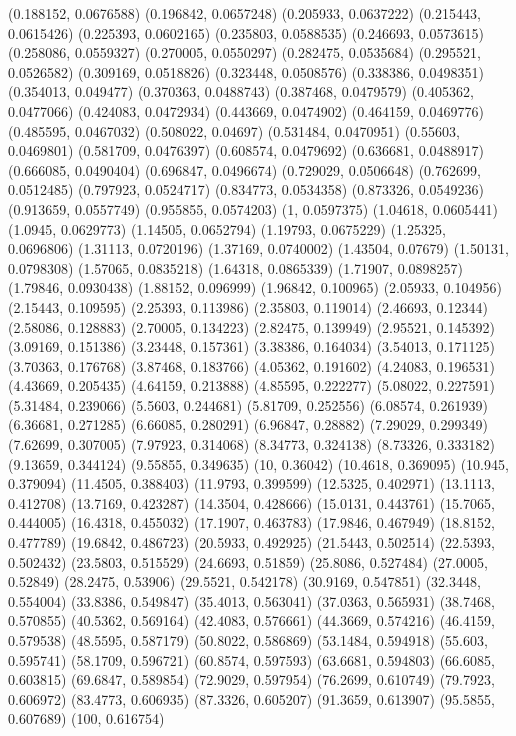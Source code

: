 {(0.188152, 0.0676588)
(0.196842, 0.0657248)
(0.205933, 0.0637222)
(0.215443, 0.0615426)
(0.225393, 0.0602165)
(0.235803, 0.0588535)
(0.246693, 0.0573615)
(0.258086, 0.0559327)
(0.270005, 0.0550297)
(0.282475, 0.0535684)
(0.295521, 0.0526582)
(0.309169, 0.0518826)
(0.323448, 0.0508576)
(0.338386, 0.0498351)
(0.354013, 0.049477)
(0.370363, 0.0488743)
(0.387468, 0.0479579)
(0.405362, 0.0477066)
(0.424083, 0.0472934)
(0.443669, 0.0474902)
(0.464159, 0.0469776)
(0.485595, 0.0467032)
(0.508022, 0.04697)
(0.531484, 0.0470951)
(0.55603, 0.0469801)
(0.581709, 0.0476397)
(0.608574, 0.0479692)
(0.636681, 0.0488917)
(0.666085, 0.0490404)
(0.696847, 0.0496674)
(0.729029, 0.0506648)
(0.762699, 0.0512485)
(0.797923, 0.0524717)
(0.834773, 0.0534358)
(0.873326, 0.0549236)
(0.913659, 0.0557749)
(0.955855, 0.0574203)
(1, 0.0597375)
(1.04618, 0.0605441)
(1.0945, 0.0629773)
(1.14505, 0.0652794)
(1.19793, 0.0675229)
(1.25325, 0.0696806)
(1.31113, 0.0720196)
(1.37169, 0.0740002)
(1.43504, 0.07679)
(1.50131, 0.0798308)
(1.57065, 0.0835218)
(1.64318, 0.0865339)
(1.71907, 0.0898257)
(1.79846, 0.0930438)
(1.88152, 0.096999)
(1.96842, 0.100965)
(2.05933, 0.104956)
(2.15443, 0.109595)
(2.25393, 0.113986)
(2.35803, 0.119014)
(2.46693, 0.12344)
(2.58086, 0.128883)
(2.70005, 0.134223)
(2.82475, 0.139949)
(2.95521, 0.145392)
(3.09169, 0.151386)
(3.23448, 0.157361)
(3.38386, 0.164034)
(3.54013, 0.171125)
(3.70363, 0.176768)
(3.87468, 0.183766)
(4.05362, 0.191602)
(4.24083, 0.196531)
(4.43669, 0.205435)
(4.64159, 0.213888)
(4.85595, 0.222277)
(5.08022, 0.227591)
(5.31484, 0.239066)
(5.5603, 0.244681)
(5.81709, 0.252556)
(6.08574, 0.261939)
(6.36681, 0.271285)
(6.66085, 0.280291)
(6.96847, 0.28882)
(7.29029, 0.299349)
(7.62699, 0.307005)
(7.97923, 0.314068)
(8.34773, 0.324138)
(8.73326, 0.333182)
(9.13659, 0.344124)
(9.55855, 0.349635)
(10, 0.36042)
(10.4618, 0.369095)
(10.945, 0.379094)
(11.4505, 0.388403)
(11.9793, 0.399599)
(12.5325, 0.402971)
(13.1113, 0.412708)
(13.7169, 0.423287)
(14.3504, 0.428666)
(15.0131, 0.443761)
(15.7065, 0.444005)
(16.4318, 0.455032)
(17.1907, 0.463783)
(17.9846, 0.467949)
(18.8152, 0.477789)
(19.6842, 0.486723)
(20.5933, 0.492925)
(21.5443, 0.502514)
(22.5393, 0.502432)
(23.5803, 0.515529)
(24.6693, 0.51859)
(25.8086, 0.527484)
(27.0005, 0.52849)
(28.2475, 0.53906)
(29.5521, 0.542178)
(30.9169, 0.547851)
(32.3448, 0.554004)
(33.8386, 0.549847)
(35.4013, 0.563041)
(37.0363, 0.565931)
(38.7468, 0.570855)
(40.5362, 0.569164)
(42.4083, 0.576661)
(44.3669, 0.574216)
(46.4159, 0.579538)
(48.5595, 0.587179)
(50.8022, 0.586869)
(53.1484, 0.594918)
(55.603, 0.595741)
(58.1709, 0.596721)
(60.8574, 0.597593)
(63.6681, 0.594803)
(66.6085, 0.603815)
(69.6847, 0.589854)
(72.9029, 0.597954)
(76.2699, 0.610749)
(79.7923, 0.606972)
(83.4773, 0.606935)
(87.3326, 0.605207)
(91.3659, 0.613907)
(95.5855, 0.607689)
(100, 0.616754)
}

